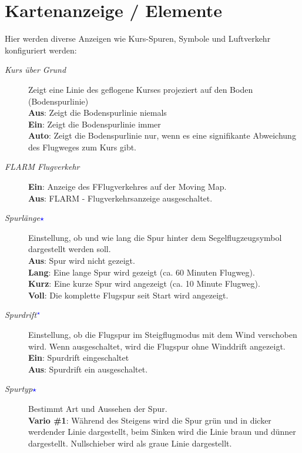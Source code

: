 \section{Kartenanzeige / Elemente}\label{sec:map-elements}
Hier werden diverse Anzeigen wie Kurs-Spuren, Symbole und Luftverkehr konfiguriert werden:
\begin{description}
\item[\textit{Kurs über Grund}] Zeigt eine Linie des geflogene Kurses projeziert auf den Boden (Bodenspurlinie)\\
   {\bf Aus}: Zeigt die Bodenspurlinie niemals\\
   {\bf Ein}: Zeigt die Bodenspurlinie immer\\
   {\bf Auto}: Zeigt die Bodenspurlinie nur, wenn es eine signifikante Abweichung des Flugweges zum Kurs gibt.
\item[\textit{FLARM Flugverkehr}]
   {\bf Ein}:  \label{conf:flarm-on-map} Anzeige des F\fl Flugverkehres auf der Moving Map.\\
   {\bf Aus}: FLARM - Flugverkehrsanzeige ausgeschaltet.
\item[\textit{Spurlänge\textcolor{blue}{$\star$}}] \label{conf:snailtrail} Einstellung, ob und wie lang die Spur hinter dem
Segelflugzeugsymbol dargestellt werden soll. \\
   {\bf Aus}: Spur wird nicht gezeigt. \\
   {\bf Lang}: Eine lange Spur wird gezeigt (ca. 60 Minuten Flugweg).\\
   {\bf Kurz}: Eine kurze Spur wird angezeigt (ca. 10 Minute Flugweg). \\
   {\bf Voll}: Die komplette Flugspur seit Start wird angezeigt.
\item[\textit{Spurdrift$^{\textcolor{blue}{\star}}$}] \label{conf:traildrift} Einstellung, ob die Flugspur im Steigflugmodus
mit dem Wind verschoben wird. Wenn ausgeschaltet, wird die Flugspur ohne Winddrift angezeigt.\\
   {\bf Ein}: Spurdrift eingeschaltet\\
   {\bf Aus}: Spurdrift ein ausgeschaltet.
\item[\textit{Spurtyp\textcolor{blue}{$\star$}}] \label{conf:snailtype} Bestimmt Art und Aussehen der Spur.\\
  {\bf Vario \#1}: Während des Steigens wird die Spur grün und in dicker werdender Linie dargestellt,
  beim Sinken wird die Linie braun und dünner dargestellt. Nullschieber wird als graue Linie dargestellt.\\

\end{description}
